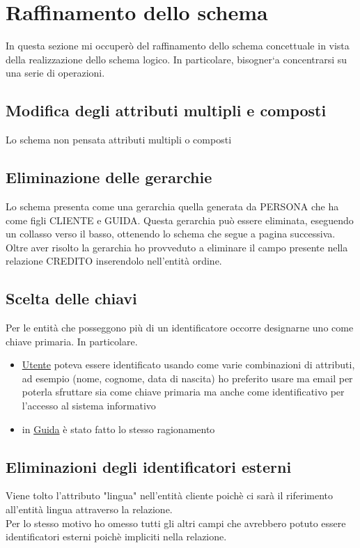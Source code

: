\documentclass[a4paper,12pt]{report}
\begin{document}
\section{Raffinamento dello schema}
In questa sezione mi occuperò del raffinamento dello schema concettuale
in vista della realizzazione dello schema logico. In particolare, bisogner`a
concentrarsi su una serie di operazioni.
\subsection*{Modifica degli attributi multipli e composti}
Lo schema non pensata attributi multipli o composti
\subsection*{Eliminazione delle gerarchie}
Lo schema presenta come una gerarchia quella generata da PERSONA che ha come figli CLIENTE
e GUIDA. Questa gerarchia può essere eliminata, eseguendo un collasso verso il basso,
ottenendo lo schema che segue a pagina successiva.
Oltre aver risolto la gerarchia ho provveduto a eliminare il campo presente nella relazione
CREDITO inserendolo nell'entità ordine.
\subsection*{Scelta delle chiavi}
Per le entità che posseggono più di un identificatore occorre designarne uno come
chiave primaria. In particolare.

\begin{itemize}
	\item \underline{Utente} poteva essere identificato usando come varie
	      combinazioni di attributi, ad esempio (nome, cognome, data di nascita) ho preferito
	      usare ma email per poterla sfruttare sia come chiave primaria ma anche come identificativo
	      per l'accesso al sistema informativo
	\item in \underline{Guida} è stato fatto lo stesso ragionamento
\end{itemize}

\subsection*{Eliminazioni degli identificatori esterni}
Viene tolto l'attributo "lingua" nell'entità cliente poichè ci sarà
il riferimento all'entità lingua attraverso la relazione.\\
Per lo stesso motivo ho omesso tutti gli altri campi che avrebbero
potuto essere identificatori esterni poichè impliciti nella relazione.
\end{document}
